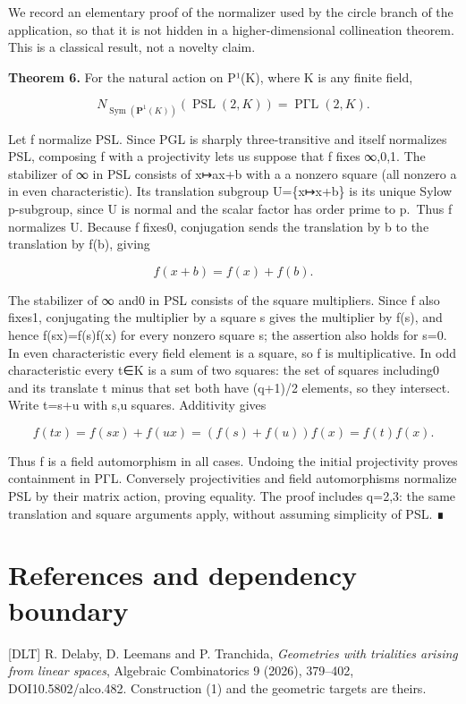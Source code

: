 We record an elementary proof of the normalizer used by the circle
branch of the application, so that it is not hidden in a
higher-dimensional collineation theorem. This is a classical result, not
a novelty claim.

\textbf{Theorem 6.} For the natural action on P¹(K), where K is any
finite field,

\[
 N_{\operatorname{Sym}(\mathbf P^1(K))}
   (\operatorname{PSL}(2,K))=\operatorname{P\Gamma L}(2,K).
\tag{9}
\]

Let f normalize PSL. Since PGL is sharply three-transitive and itself
normalizes PSL, composing f with a projectivity lets us suppose that f
fixes ∞,0,1. The stabilizer of ∞ in PSL consists of x↦ax+b with a a
nonzero square (all nonzero a in even characteristic). Its translation
subgroup U=\{x↦x+b\} is its unique Sylow p-subgroup, since U is normal
and the scalar factor has order prime to p.~Thus f normalizes U. Because
f fixes0, conjugation sends the translation by b to the translation by
f(b), giving

\[
 f(x+b)=f(x)+f(b).
\tag{10}
\]

The stabilizer of ∞ and0 in PSL consists of the square multipliers.
Since f also fixes1, conjugating the multiplier by a square s gives the
multiplier by f(s), and hence f(sx)=f(s)f(x) for every nonzero square s;
the assertion also holds for s=0. In even characteristic every field
element is a square, so f is multiplicative. In odd characteristic every
t∈K is a sum of two squares: the set of squares including0 and its
translate t minus that set both have (q+1)/2 elements, so they
intersect. Write t=s+u with s,u squares. Additivity gives

\[
 f(tx)=f(sx)+f(ux)=(f(s)+f(u))f(x)=f(t)f(x).
\]

Thus f is a field automorphism in all cases. Undoing the initial
projectivity proves containment in PΓL. Conversely projectivities and
field automorphisms normalize PSL by their matrix action, proving
equality. The proof includes q=2,3: the same translation and square
arguments apply, without assuming simplicity of PSL. ∎

\section{References and dependency
boundary}\label{references-and-dependency-boundary}

{[}DLT{]} R. Delaby, D. Leemans and P. Tranchida, \emph{Geometries with
trialities arising from linear spaces}, Algebraic Combinatorics 9
(2026), 379--402, DOI10.5802/alco.482. Construction (1) and the
geometric targets are theirs.

